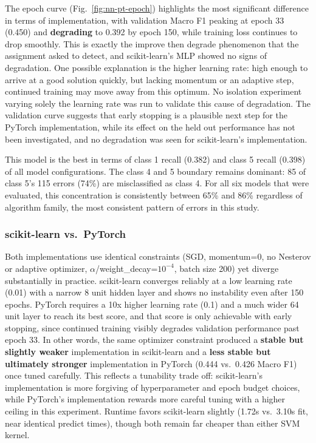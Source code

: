 \documentclass[conference]{IEEEtran}
\begin{document}
The epoch curve (Fig.~\ref{fig:nn-pt-epoch}) highlights the most significant difference in terms of implementation, with validation Macro F1 peaking at epoch 33 (0.450) and \textbf{degrading} to 0.392 by epoch 150, while training loss continues to drop smoothly. This is exactly the improve then degrade phenomenon that the assignment asked to detect, and scikit-learn's MLP showed no signs of degradation. One possible explanation is the higher learning rate: high enough to arrive at a good solution quickly, but lacking momentum or an adaptive step, continued training may move away from this optimum. No isolation experiment varying solely the learning rate was run to validate this cause of degradation. The validation curve suggests that early stopping is a plausible next step for the PyTorch implementation, while its effect on the held out performance has not been investigated, and no degradation was seen for scikit-learn's implementation.

This model is the best in terms of class 1 recall (0.382) and class 5 recall (0.398) of all model configurations. The class 4 and 5 boundary remains dominant: 85 of class 5's 115 errors (74\%) are misclassified as class 4. For all six models that were evaluated, this concentration is consistently between 65\% and 86\% regardless of algorithm family, the most consistent pattern of errors in this study.

\subsubsection{scikit-learn vs.\ PyTorch}

Both implementations use identical constraints (SGD, momentum=0, no Nesterov or adaptive optimizer, $\alpha$/weight\_decay=$10^{-4}$, batch size 200) yet diverge substantially in practice. scikit-learn converges reliably at a low learning rate (0.01) with a narrow 8 unit hidden layer and shows no instability even after 150 epochs. PyTorch requires a 10x higher learning rate (0.1) and a much wider 64 unit layer to reach its best score, and that score is only achievable with early stopping, since continued training visibly degrades validation performance past epoch 33. In other words, the same optimizer constraint produced a \textbf{stable but slightly weaker} implementation in scikit-learn and a \textbf{less stable but ultimately stronger} implementation in PyTorch (0.444 vs.\ 0.426 Macro F1) once tuned carefully. This reflects a tunability trade off: scikit-learn's implementation is more forgiving of hyperparameter and epoch budget choices, while PyTorch's implementation rewards more careful tuning with a higher ceiling in this experiment. Runtime favors scikit-learn slightly (1.72s vs.\ 3.10s fit, near identical predict times), though both remain far cheaper than either SVM kernel.
\end{document}
